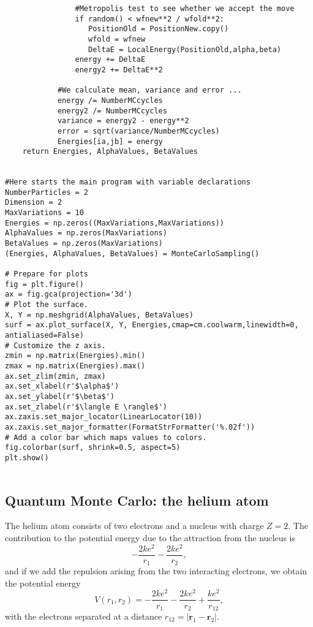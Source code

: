 \documentclass[%
oneside,                 %
final,                   %
10pt]{article}
\begin{document}
\begin{verbatim}
                #Metropolis test to see whether we accept the move
                if random() < wfnew**2 / wfold**2:
                   PositionOld = PositionNew.copy()
                   wfold = wfnew
                   DeltaE = LocalEnergy(PositionOld,alpha,beta)
                energy += DeltaE
                energy2 += DeltaE**2

            #We calculate mean, variance and error ...
            energy /= NumberMCcycles
            energy2 /= NumberMCcycles
            variance = energy2 - energy**2
            error = sqrt(variance/NumberMCcycles)
            Energies[ia,jb] = energy    
    return Energies, AlphaValues, BetaValues


#Here starts the main program with variable declarations
NumberParticles = 2
Dimension = 2
MaxVariations = 10
Energies = np.zeros((MaxVariations,MaxVariations))
AlphaValues = np.zeros(MaxVariations)
BetaValues = np.zeros(MaxVariations)
(Energies, AlphaValues, BetaValues) = MonteCarloSampling()

# Prepare for plots
fig = plt.figure()
ax = fig.gca(projection='3d')
# Plot the surface.
X, Y = np.meshgrid(AlphaValues, BetaValues)
surf = ax.plot_surface(X, Y, Energies,cmap=cm.coolwarm,linewidth=0, antialiased=False)
# Customize the z axis.
zmin = np.matrix(Energies).min()
zmax = np.matrix(Energies).max()
ax.set_zlim(zmin, zmax)
ax.set_xlabel(r'$\alpha$')
ax.set_ylabel(r'$\beta$')
ax.set_zlabel(r'$\langle E \rangle$')
ax.zaxis.set_major_locator(LinearLocator(10))
ax.zaxis.set_major_formatter(FormatStrFormatter('%.02f'))
# Add a color bar which maps values to colors.
fig.colorbar(surf, shrink=0.5, aspect=5)
plt.show()


\end{verbatim}


\subsection*{Quantum Monte Carlo: the helium atom}

The helium atom consists of two electrons and a nucleus with
charge $Z=2$. 
The contribution  
to the potential energy due to the attraction from the nucleus is
\[
   -\frac{2ke^2}{r_1}-\frac{2ke^2}{r_2},
\] 
and if we add the repulsion arising from the two 
interacting electrons, we obtain the potential energy
\[
 V(r_1, r_2)=-\frac{2ke^2}{r_1}-\frac{2ke^2}{r_2}+
               \frac{ke^2}{r_{12}},
\]
with the electrons separated at a distance 
$r_{12}=|\bm{r}_1-\bm{r}_2|$.
\end{document}
